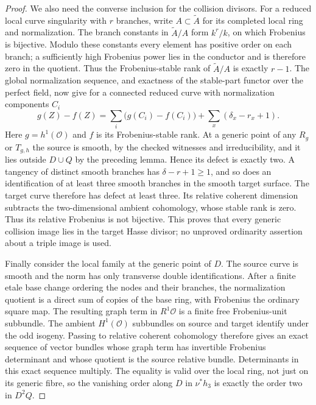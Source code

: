 \begin{proof}
We also need the converse inclusion for the collision divisors.
For a reduced local curve singularity with $r$ branches, write
$A\subset\widetilde A$ for its completed local ring and normalization.
The branch constants in $\widetilde A/A$ form $k^r/k$, on which
Frobenius is bijective. Modulo these constants every element has
positive order on each branch; a sufficiently high Frobenius power
lies in the conductor and is therefore zero in the quotient.
Thus the Frobenius-stable rank of $\widetilde A/A$ is exactly $r-1$.
The global normalization sequence, and exactness of the stable-part
functor over the perfect field, now give for a connected reduced
curve with normalization components $C_i$
\[
 g(Z)-f(Z)=\sum_i\bigl(g(C_i)-f(C_i)\bigr)
              +\sum_x(\delta_x-r_x+1).
\]
Here $g=h^1(\mathcal O)$ and $f$ is its Frobenius-stable rank.
At a generic point of any $R_g$ or $T_{g,h}$ the source is smooth,
by the checked witnesses and irreducibility, and it lies outside
$D\cup Q$ by the preceding lemma. Hence its defect is exactly two.
A tangency of distinct smooth branches has
$\delta-r+1\ge1$, and so does an identification of at least three
smooth branches in the smooth target surface. The target curve
therefore has defect at least three. Its relative coherent dimension
subtracts the two-dimensional ambient cohomology, whose stable rank
is zero. Thus its relative Frobenius is not bijective. This proves
that every generic collision image lies in the target Hasse divisor;
no unproved ordinarity assertion about a triple image is used.

Finally consider the local family at the generic point of $D$.
The source curve is smooth and the norm has only transverse double
identifications. After a finite etale base change ordering the nodes
and their branches, the normalization quotient is a direct sum of
copies of the base ring, with Frobenius the ordinary square map.
The resulting graph term in $R^1\mathcal O$ is a finite free
Frobenius-unit subbundle. The ambient $H^1(\mathcal O)$ subbundles
on source and target identify under the odd isogeny. Passing to
relative coherent cohomology therefore gives an exact sequence of
vector bundles whose graph term has invertible Frobenius determinant
and whose quotient is the source relative bundle. Determinants in
this exact sequence multiply. The equality is valid over the local
ring, not just on its generic fibre, so the vanishing order along
$D$ in $\nu^*h_3$ is exactly the order two in $D^2Q$.


\end{proof}
